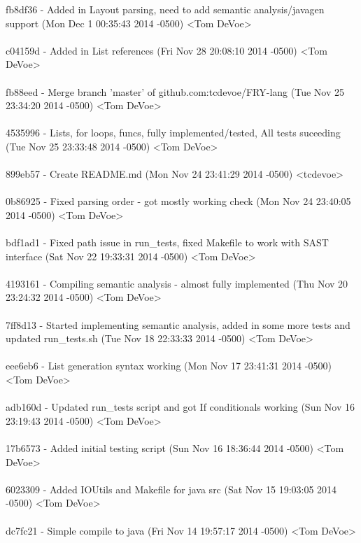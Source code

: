 \documentclass{article}
\newenvironment{allintypewriter}{\ttfamily}{\par}
\begin{document}
\begin{allintypewriter}
fb8df36 - Added in Layout parsing, need to add semantic analysis/javagen support (Mon Dec 1 00:35:43 2014 -0500) <Tom DeVoe>
\\ \\
c04159d - Added in List references (Fri Nov 28 20:08:10 2014 -0500) <Tom DeVoe>
\\ \\
fb88eed - Merge branch 'master' of github.com:tcdevoe/FRY-lang (Tue Nov 25 23:34:20 2014 -0500) <Tom DeVoe>
\\ \\
4535996 - Lists, for loops, funcs, fully implemented/tested, All tests suceeding (Tue Nov 25 23:33:48 2014 -0500) <Tom DeVoe>
\\ \\
899eb57 - Create README.md (Mon Nov 24 23:41:29 2014 -0500) <tcdevoe>
\\ \\
0b86925 - Fixed parsing order - got mostly working check (Mon Nov 24 23:40:05 2014 -0500) <Tom DeVoe>
\\ \\
bdf1ad1 - Fixed path issue in run\_tests, fixed Makefile to work with SAST interface (Sat Nov 22 19:33:31 2014 -0500) <Tom DeVoe>
\\ \\
4193161 - Compiling semantic analysis - almost fully implemented (Thu Nov 20 23:24:32 2014 -0500) <Tom DeVoe>
\\ \\
7ff8d13 - Started implementing semantic analysis, added in some more tests and updated run\_tests.sh (Tue Nov 18 22:33:33 2014 -0500) <Tom DeVoe>
\\ \\
eee6eb6 - List generation syntax working (Mon Nov 17 23:41:31 2014 -0500) <Tom DeVoe>
\\ \\
adb160d - Updated run\_tests script and got If conditionals working (Sun Nov 16 23:19:43 2014 -0500) <Tom DeVoe>
\\ \\
17b6573 - Added initial testing script (Sun Nov 16 18:36:44 2014 -0500) <Tom DeVoe>
\\ \\
6023309 - Added IOUtils and Makefile for java src (Sat Nov 15 19:03:05 2014 -0500) <Tom DeVoe>
\\ \\
dc7fc21 - Simple compile to java (Fri Nov 14 19:57:17 2014 -0500) <Tom DeVoe>
\\ \\

\end{allintypewriter}
\end{document}
